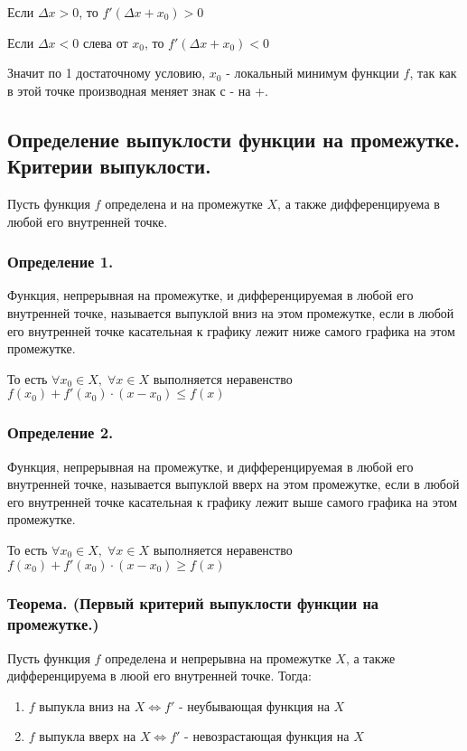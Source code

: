 \documentclass[a4paper,12pt]{article}
\theoremstyle{plain} %
\theoremstyle{definition} %
\theoremstyle{remark} %
\begin{document}
Если $\Delta x > 0$, то $f'(\Delta x + x_0) > 0$

Если $\Delta x < 0$ слева от $x_0$, то $f'(\Delta x + x_0) < 0$

Значит по 1 достаточному условию, $x_0$ - локальный минимум функции $f$, так как в этой точке производная меняет знак с - на +.


\newpage
\subsection*{Определение выпуклости функции на промежутке. Критерии выпуклости.                                       }
Пусть функция $f$ определена и на промежутке $X$, а также дифференцируема в любой его внутренней точке.

\subsubsection*{Определение 1.}
Функция, непрерывная на промежутке, и дифференцируемая в любой его внутренней точке, называется выпуклой вниз на этом промежутке, если в любой его внутренней точке касательная к графику лежит ниже самого графика на этом промежутке.

То есть $\forall x_0 \in X, \; \forall x \in X$ выполняется неравенство $f(x_0) + f'(x_0) \cdot (x - x_0) \leq f(x)$

\subsubsection*{Определение 2.}
Функция, непрерывная на промежутке, и дифференцируемая в любой его внутренней точке, называется выпуклой вверх на этом промежутке, если в любой его внутренней точке касательная к графику лежит выше самого графика на этом промежутке.

То есть $\forall x_0 \in X, \; \forall x \in X$ выполняется неравенство $f(x_0) + f'(x_0) \cdot (x - x_0) \geq f(x)$

\subsubsection*{Теорема. (Первый критерий выпуклости функции на промежутке.)}
Пусть функция $f$ определена и непрерывна на промежутке $X$, а также дифференцируема в люой его внутренней точке. Тогда:

\begin{enumerate}
	\item $f$ выпукла вниз на $X \Leftrightarrow f'$ - неубывающая функция на $X$
	\item $f$ выпукла вверх на $X \Leftrightarrow f'$ - невозрастающая функция на $X$
\end{enumerate}
\end{document}

